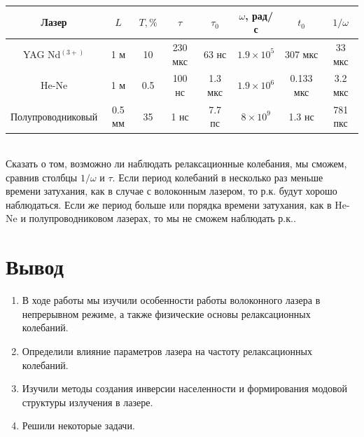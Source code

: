 \documentclass[a4paper, 12pt]{article}
\begin{document}
\begin{enumerate}
\begin{table}[!htb]
				\centering
				\begin{tabular}{|c|c|c|c|c|c|c|c|}
					\hline
					Лазер & $L$ & $T,\%$ & $\tau$ & $\tau_0$ & $\omega$, рад/с & $t_0$ & $1/\omega$\\
					\hline
					YAG Nd$^{(3+)}$ & 1 м & 10 & 230 мкс & 63 нс & $1.9\times 10^5$ & 307 мкс & 33 мкс\\
					He-Ne & 1 м & 0.5 & 100 нс & 1.3 мкс & $1.9\times 10^{6}$ & 0.133 мкс & 3.2 мкс\\
					Полупроводниковый & 0.5 мм & 35 & 1 нс & 7.7 пс & $8\times 10^9$ & 1.3 нс & 781 пкс\\
					\hline
				\end{tabular}
			\end{table}
			\\
			Сказать о том, возможно ли наблюдать релаксационные колебания, мы сможем, сравнив столбцы $1/\omega$ и $\tau$. Если период колебаний в несколько раз меньше времени затухания, как в случае с волоконным лазером, то р.к. будут хорошо наблюдаться. Если же период больше или порядка времени затухания, как в He-Ne и полупроводниковом лазерах, то мы не сможем наблюдать р.к..
	\end{enumerate}
	\section{Вывод}
	\begin{enumerate}
		\item В ходе работы мы изучили особенности работы волоконного лазера в непрерывном режиме, а также физические основы релаксационных колебаний.
		\item Определили влияние параметров лазера на частоту релаксационных колебаний.
		\item Изучили методы создания инверсии населенности и формирования модовой структуры излучения в лазере.
		\item Решили некоторые задачи.
	\end{enumerate}
\end{document}
